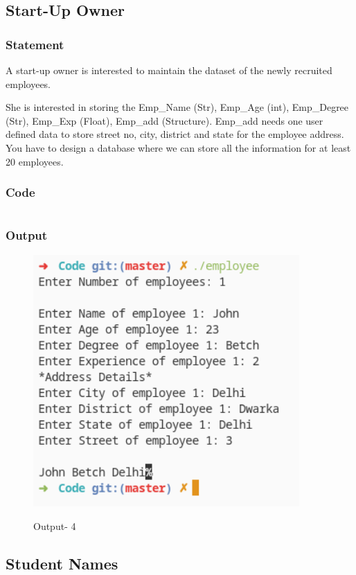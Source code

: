 \pagebreak
\subsection{Start-Up Owner}

\subsubsection{Statement}
A start-up owner is interested to maintain the dataset of the newly recruited employees.

She is interested in storing the Emp\_Name (Str), Emp\_Age (int), Emp\_Degree (Str), Emp\_Exp
(Float), Emp\_add (Structure). Emp\_add needs one user defined data to store street no, city,
district and state for the employee address. You have to design a database where we can store all
the information for at least 20 employees.

\subsubsection{Code}
\inputminted[]{c}{../Code/employee.cpp}
\pagebreak
\subsubsection{Output}
\begin{figure}[!htb]
  \centering
  \includegraphics[width=4in]{Images/employee.png}
  \label{Output-4}
  \caption{Output- 4}
\end{figure}


\pagebreak
\subsection{Student Names}

